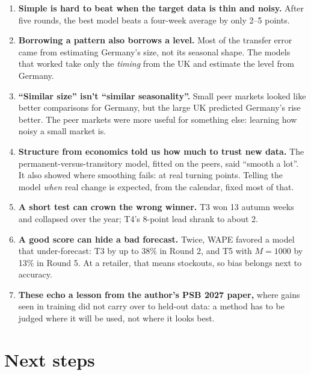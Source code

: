 \documentclass[11pt]{article}
\begin{document}
\begin{enumerate}
\item \textbf{Simple is hard to beat when the target data is thin and noisy.} After five rounds, the best
model beats a four-week average by only 2--5 points.
\item \textbf{Borrowing a pattern also borrows a level.} Most of the transfer error came from estimating
Germany's size, not its seasonal shape. The models that worked take only the \emph{timing} from the UK and
estimate the level from Germany.
\item \textbf{``Similar size'' isn't ``similar seasonality''.} Small peer markets looked like better
comparisons for Germany, but the large UK predicted Germany's rise better. The peer markets were more
useful for something else: learning how noisy a small market is.
\item \textbf{Structure from economics told us how much to trust new data.} The permanent-versus-transitory
model, fitted on the peers, said ``smooth a lot''. It also showed where smoothing fails: at real turning
points. Telling the model \emph{when} real change is expected, from the calendar, fixed most of that.
\item \textbf{A short test can crown the wrong winner.} T3 won 13 autumn weeks and collapsed over the
year; T4's 8-point lead shrank to about 2.
\item \textbf{A good score can hide a bad forecast.} Twice, WAPE favored a model that under-forecast:
T3 by up to 38\% in Round 2, and T5 with $M = 1000$ by 13\% in Round 5. At a retailer, that means
stockouts, so bias belongs next to accuracy.
\item \textbf{These echo a lesson from the author's PSB 2027 paper,} where gains seen in training did not
carry over to held-out data: a method has to be judged where it will be used, not where it looks best.
\end{enumerate}

\section{Next steps}
\end{document}
